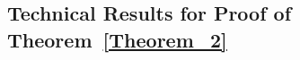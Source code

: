 \documentclass[twoside,11pt]{article}
\begin{document}



    
\subsection{Technical Results for Proof of Theorem~\ref{Theorem_2}}
\end{document}
